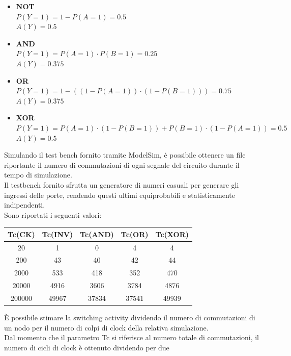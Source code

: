 \documentclass[11pt,  english, makeidx, a4paper, titlepage, oneside]{book}
\begin{document}
\begin{itemize}
	\item \textbf{NOT} \\
	$P(Y=1) = 1 - P(A=1) = 0.5$ \\
	$A(Y) = 0.5$
	\item \textbf{AND} \\
	$P(Y=1) = P(A=1) \cdot P(B=1) = 0.25$ \\
	$A(Y) = 0.375$
	\item \textbf{OR} \\
	$P(Y=1) = 1-((1-P(A=1)) \cdot(1-P(B=1))) = 0.75$ \\
	$A(Y) = 0.375$
	\item \textbf{XOR} \\
	$P(Y=1) = P(A=1) \cdot(1-P(B=1)) + P(B=1) \cdot(1-P(A=1)) = 0.5$ \\
	$A(Y) = 0.5$ 
\end{itemize} 
Simulando il test bench fornito tramite ModelSim, è possibile ottenere un file 
riportante il numero di commutazioni di ogni segnale del circuito durante il 
tempo di simulazione.
\\
Il testbench fornito sfrutta un generatore di numeri casuali per generare gli 
ingressi delle porte, rendendo questi ultimi equiprobabili e statisticamente 
indipendenti.
\\
Sono riportati i seguenti valori:
\\
\begin{center}
	\begin{tabular}{|c|c|c|c|c|} %
 	\hline %
 	Tc(CK) & Tc(INV) & Tc(AND) & Tc(OR) & Tc(XOR) \\ 
 	\hline
 	20 & 1 & 0 & 4 & 4 \\ 
 	\hline
 	200 & 43 & 40 & 42 & 44 \\ 
 	\hline
 	2000 & 533 & 418 & 352 & 470 \\
 	\hline
 	20000 & 4916 & 3606 & 3784 & 4876 \\
 	\hline
 	200000 & 49967 & 37834 & 37541 & 49939 \\
 	\hline
	\end{tabular}
\end{center}
\vspace{0.3cm}
È possibile stimare la switching activity dividendo il numero 
di commutazioni di un nodo per il numero di colpi di clock della
relativa simulazione.
\\
Dal momento che il parametro Tc si riferisce al numero totale di 
commutazioni, il numero di cicli di clock è ottenuto dividendo per due
\end{document}
